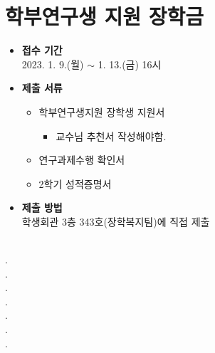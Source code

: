 \documentclass[aps,reprint,superscriptaddress,11pt]{revtex4-2}
\begin{document}
\maketitle



\section{학부연구생 지원 장학금}
\begin{itemize}
  \item{\bf 접수 기간}\\ 2023. 1. 9.(월) $\sim$ 1. 13.(금) 16시
  \item{\bf 제출 서류} 
  \begin{itemize}
    \item 학부연구생지원 장학생 지원서
    \begin{itemize}\tiny
      \item 교수님 추천서 작성해야함.
    \end{itemize}
    \item 연구과제수행 확인서
    \item 2학기 성적증명서
  \end{itemize}
  \item{\bf 제출 방법}\\
  학생회관 3층 343호(장학복지팀)에 직접 제출
\end{itemize}
\\.
\\.
\\.
\\.
\\.
\\.
\\.
\end{document}
